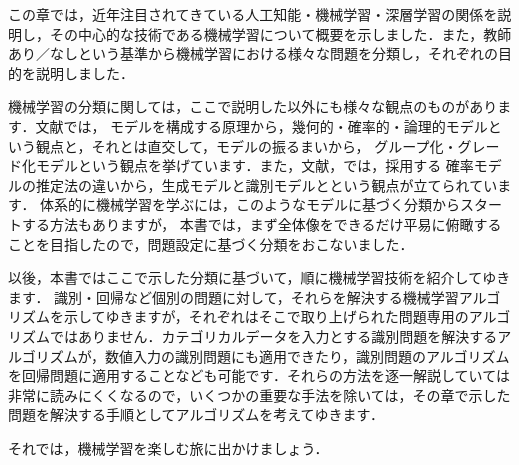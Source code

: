 
この章では，近年注目されてきている人工知能・機械学習・深層学習の関係を説明し，その中心的な技術である機械学習について概要を示しました．また，教師あり／なしという基準から機械学習における様々な問題を分類し，それぞれの目的を説明しました．


機械学習の分類に関しては，ここで説明した以外にも様々な観点のものがあります．文献\cite{flach12}では，
モデルを構成する原理から，幾何的・確率的・論理的モデルという観点と，それとは直交して，モデルの振るまいから，
グループ化・グレード化モデルという観点を挙げています．また，文献\cite{sugiyama09}，\cite{sugiyama13}では，採用する
確率モデルの推定法の違いから，生成モデル\cite{sugiyama09}と識別モデル\cite{sugiyama13}とという観点が立てられています．
体系的に機械学習を学ぶには，このようなモデルに基づく分類からスタートする方法もありますが，
本書では，まず全体像をできるだけ平易に俯瞰することを目指したので，問題設定に基づく分類をおこないました．


以後，本書ではここで示した分類に基づいて，順に機械学習技術を紹介してゆきます．
識別・回帰など個別の問題に対して，それらを解決する機械学習アルゴリズムを示してゆきますが，それぞれはそこで取り上げられた問題専用のアルゴリズムではありません．カテゴリカルデータを入力とする識別問題を解決するアルゴリズムが，数値入力の識別問題にも適用できたり，識別問題のアルゴリズムを回帰問題に適用することなども可能です．それらの方法を逐一解説していては非常に読みにくくなるので，いくつかの重要な手法を除いては，その章で示した問題を解決する手順としてアルゴリズムを考えてゆきます．

それでは，機械学習を楽しむ旅に出かけましょう．

